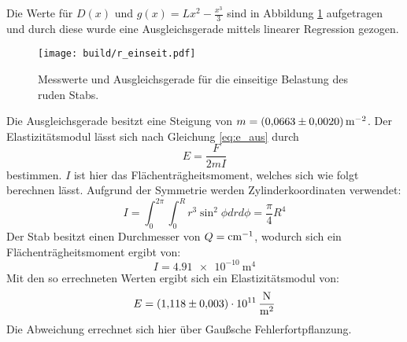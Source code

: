 \noindent Die Werte für $D(x)$ und $g(x)=Lx^2-\frac{x^3}{3}$ sind in Abbildung \ref{fig:plot1}
aufgetragen und durch diese wurde eine Ausgleichsgerade mittels linearer Regression gezogen.
\begin{figure}
    \centering
    \texttt{[image: build/r\_einseit.pdf]}
    \caption{Messwerte und Ausgleichsgerade für die einseitige Belastung des ruden Stabs.}
    \label{fig:plot1}
\end{figure}
%
\noindent Die Ausgleichsgerade besitzt eine Steigung von $m=\SI[per-mode=reciprocal]{0.0663\pm
0.002}{\per\meter\squared}$.
Der Elastizitätsmodul lässt sich nach Gleichung \eqref{eq:e_aus} durch
\begin{equation}
  E=\frac{F}{2mI}
\end{equation}
bestimmen.
$I$ ist hier das Flächenträgheitsmoment, welches sich wie folgt berechnen lässt.
Aufgrund der Symmetrie werden Zylinderkoordinaten verwendet:
\begin{equation}
  I=\int_0^{2\pi} \int_0^R r^3 \sin^2{\phi} dr d\phi=\frac{\pi}{4}R^4
\end{equation}
Der Stab besitzt einen Durchmesser von $Q=\si[per-mode=reciprocal]{\per\centi\meter}$, wodurch
sich ein Flächenträgheitsmoment ergibt von:
\begin{equation*}
  I=\SI{4.91e-10}{\meter\tothe{4}}
\end{equation*}
Mit den so errechneten Werten ergibt sich ein Elastizitätsmodul von:
\begin{equation*}
  E=\SI{1.118\pm0.003e11}{\newton\per\meter\squared}
\end{equation*}
Die Abweichung errechnet sich hier über Gaußsche Fehlerfortpflanzung.
%
